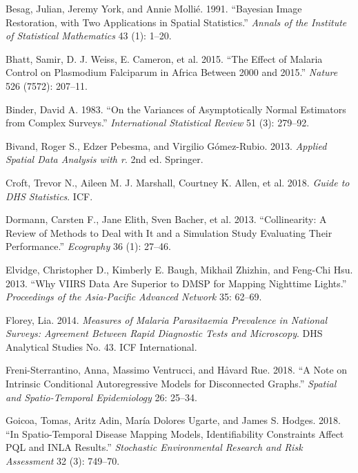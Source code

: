 \documentclass{article}
\newlength{\cslhangindent}
\newenvironment{CSLReferences}[2] %
 {\begin{list}{}{%
  \setlength{\itemindent}{0pt}
  \setlength{\leftmargin}{0pt}
  \setlength{\parsep}{0pt}
  \ifodd #1
   \setlength{\leftmargin}{\cslhangindent}
   \setlength{\itemindent}{-1\cslhangindent}
  \fi
  \setlength{\itemsep}{#2\baselineskip}}}
 {\end{list}}
\begin{document}
\protect{}\label{refs}
\begin{CSLReferences}{1}{1}
Besag, Julian, Jeremy York, and Annie Mollié. 1991. {``Bayesian Image
Restoration, with Two Applications in Spatial Statistics.''}
\emph{Annals of the Institute of Statistical Mathematics} 43 (1): 1--20.

{Bhatt, Samir, D. J. Weiss, E. Cameron, et al.} 2015. {``The Effect of
Malaria Control on Plasmodium Falciparum in Africa Between 2000 and
2015.''} \emph{Nature} 526 (7572): 207--11.

Binder, David A. 1983. {``On the Variances of Asymptotically Normal
Estimators from Complex Surveys.''} \emph{International Statistical
Review} 51 (3): 279--92.

Bivand, Roger S., Edzer Pebesma, and Virgilio Gómez-Rubio. 2013.
\emph{Applied Spatial Data Analysis with r}. 2nd ed. Springer.

{Croft, Trevor N., Aileen M. J. Marshall, Courtney K. Allen, et al.}
2018. \emph{Guide to DHS Statistics}. ICF.

{Dormann, Carsten F., Jane Elith, Sven Bacher, et al.} 2013.
{``Collinearity: A Review of Methods to Deal with It and a Simulation
Study Evaluating Their Performance.''} \emph{Ecography} 36 (1): 27--46.

Elvidge, Christopher D., Kimberly E. Baugh, Mikhail Zhizhin, and
Feng-Chi Hsu. 2013. {``Why VIIRS Data Are Superior to DMSP for Mapping
Nighttime Lights.''} \emph{Proceedings of the Asia-Pacific Advanced
Network} 35: 62--69.

Florey, Lia. 2014. \emph{Measures of Malaria Parasitaemia Prevalence in
National Surveys: Agreement Between Rapid Diagnostic Tests and
Microscopy}. DHS Analytical Studies No. 43. ICF International.

Freni-Sterrantino, Anna, Massimo Ventrucci, and Håvard Rue. 2018. {``A
Note on Intrinsic Conditional Autoregressive Models for Disconnected
Graphs.''} \emph{Spatial and Spatio-Temporal Epidemiology} 26: 25--34.

Goicoa, Tomas, Aritz Adin, María Dolores Ugarte, and James S. Hodges.
2018. {``In Spatio-Temporal Disease Mapping Models, Identifiability
Constraints Affect PQL and INLA Results.''} \emph{Stochastic
Environmental Research and Risk Assessment} 32 (3): 749--70.


\end{CSLReferences}
\end{document}
